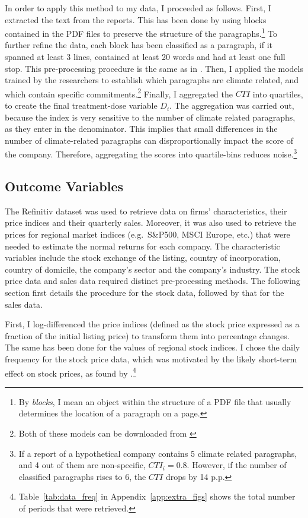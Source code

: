 \documentclass[12pt]{article}
\begin{document}
In order to apply this method to my data, I proceeded as follows. First, I extracted the text from the reports. This has been done by using blocks contained in the PDF files to preserve the structure of the paragraphs.\footnote{By \textit{blocks}, I mean an object within the structure of a PDF file that usually determines the location of a paragraph on a page.} To further refine the data, each block has been classified as a paragraph, if it spanned at least 3 lines, contained at least 20 words and had at least one full stop. This pre-processing procedure is the same as in \textcite{binglerHowCheapTalk2024}. Then, I applied the models trained by the researchers to establish which paragraphs are climate related, and which contain specific commitments.\footnote{Both of these models can be downloaded from \href{https://huggingface.co/climatebert}{}} Finally, I aggregated the $CTI$ into quartiles, to create the final treatment-dose variable $D_i$. The aggregation was carried out, because the index is very sensitive to the number of climate related paragraphs, as they enter in the denominator. This implies that small differences in the number of climate-related  paragraphs can disproportionally impact the score of the company. Therefore, aggregating the scores into quartile-bins reduces noise.\footnote{If a report of a hypothetical company contains 5 climate related paragraphs, and 4 out of them are non-specific, $CTI_i=0.8$. However, if the number of classified paragraphs rises to 6, the $CTI$ drops by 14 p.p.}



\subsection{Outcome Variables}

The Refinitiv dataset was used to retrieve data on firms' characteristics, their price indices and their quarterly sales. Moreover, it was also used to retrieve the prices for regional market indices (e.g.\ S\&P500, MSCI Europe, etc.) that were needed to estimate the normal returns for each company. The characteristic variables include the stock exchange of the listing, country of incorporation, country of domicile, the company's sector and the company's industry. The stock price data and sales data required distinct pre-processing methods. The following section first details the procedure for the stock data, followed by that for the sales data.

First, I log-differenced the price indices (defined as the stock price expressed as a fraction of the initial listing price) to transform them into percentage changes. The same has been done for the values of regional stock indices. I chose the daily frequency for the stock price data, which was motivated by the likely short-term effect on stock prices, as found by \textcite{schusterStockPriceReactions2023}.\footnote{Table~\ref{tab:data_freq} in Appendix~\ref{app:extra_figs} shows the total number of periods that were retrieved.}
\end{document}
